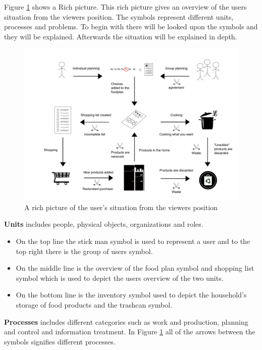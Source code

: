 Figure \ref{RigtBillede} shows a Rich picture. This rich picture gives an overview of the users situation from the viewers position. The symbols represent different units, processes and problems. To begin with there will be looked upon the symbols and they will be explained. Afterwards the situation will be explained in depth.

  \begin{figure}[H]
	\centering
	\includegraphics[width=1.00\textwidth]{Grafik/FoodPlanner/InkscapeTegninger/RigtBillede.pdf}
	\caption{A rich picture of the user's situation from the viewers position}
	\label{RigtBillede}
\end{figure}
\textbf{Units} includes people, physical objects, organizations and roles.
\begin{itemize}
  \item On the top line the stick man symbol is used to represent a user and to the top right there is the group of users symbol. 
  \item On the middle line is the overview of the food plan symbol and shopping list symbol which is used to depict the users overview of the two units. 
  \item On the bottom line is the inventory symbol used to depict the household's storage of food products and the trashcan symbol.    
\end{itemize}
\textbf{Processes} includes different categories such as work and production, planning and control and information treatment. In Figure \ref{RigtBillede} all of the arrows between the symbols signifies different processes.
